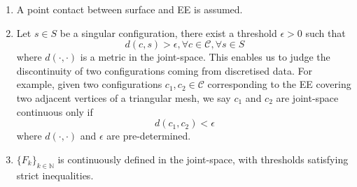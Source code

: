 \documentclass[journal]{IEEEtran}
\begin{document}
\begin{enumerate}
\item A point contact between surface and EE is assumed. 
\item 

Let $s\in S$ be a singular configuration, there exist a threshold $\epsilon > 0$ such that 
\begin{equation}
d(c, s) > \epsilon, \forall c\in \mathscr{C}, \forall s\in S
\end{equation}
where $d(\cdot, \cdot)$ is a metric in the joint-space. This enables us to judge the discontinuity of two configurations coming from discretised data. 
For example, given two configurations $c_1, c_2\in \mathscr{C}$ corresponding to the EE covering two adjacent vertices of a triangular mesh, we say $c_1$ and $c_2$ are joint-space continuous only if 
\begin{equation}
d(c_1, c_2) < \epsilon
\end{equation}
where $d(\cdot, \cdot)$ and $\epsilon$ are pre-determined. 
\item $\{F_k\}_{k\in \mathbb{N}}$ is continuously defined in the joint-space, with thresholds satisfying strict inequalities. 

\end{enumerate}
\end{document}
